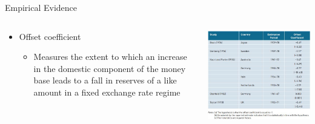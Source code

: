 \documentclass[10pt,hyperref={CJKbookmarks=true},xcolor=dvipsnames,aspectratio=169]{beamer}
\begin{document}
\begin{frame}{Empirical Evidence}




\begin{columns}[onlytextwidth]
\begin{column}{0.4\textwidth}
\begin{itemize}
\item Offset coefficient

\begin{itemize}
\item Measures the extent to which an increase in the domestic component
of the money base leads to a fall in reserves of a like amount in
a fixed exchange rate regime
\end{itemize}
\end{itemize}

\end{column}
\begin{column}{0.6\textwidth}
\includegraphics[width=\columnwidth]{fig/boptheory/lec08-26}
\end{column}
\end{columns}

\end{frame}
\end{document}
